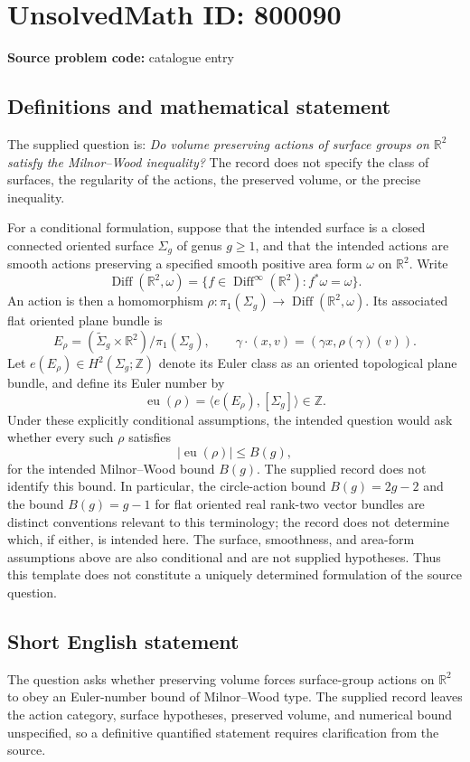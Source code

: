 \documentclass[11pt]{article}
\newcommand{\Z}{\mathbb{Z}}
\newcommand{\R}{\mathbb{R}}
\begin{document}
\section*{UnsolvedMath ID: 800090}
\textbf{Source problem code:} catalogue entry
\subsection{Definitions and mathematical statement}
The supplied question is: \emph{Do volume preserving actions of surface groups on $\R^2$ satisfy the Milnor--Wood inequality?} The record does not specify the class of surfaces, the regularity of the actions, the preserved volume, or the precise inequality.

For a conditional formulation, suppose that the intended surface is a closed connected oriented surface $\Sigma_g$ of genus $g\geq 1$, and that the intended actions are smooth actions preserving a specified smooth positive area form $\omega$ on $\R^2$. Write
\[
\operatorname{Diff}(\R^2,\omega)=\{f\in\operatorname{Diff}^{\infty}(\R^2):f^*\omega=\omega\}.
\]
An action is then a homomorphism $\rho:\pi_1(\Sigma_g)\to\operatorname{Diff}(\R^2,\omega)$. Its associated flat oriented plane bundle is
\[
E_\rho=(\widetilde{\Sigma}_g\times\R^2)/\pi_1(\Sigma_g),\qquad
\gamma\cdot(x,v)=(\gamma x,\rho(\gamma)(v)).
\]
Let $e(E_\rho)\in H^2(\Sigma_g;\Z)$ denote its Euler class as an oriented topological plane bundle, and define its Euler number by
\[
\operatorname{eu}(\rho)=\langle e(E_\rho),[\Sigma_g]\rangle\in\Z.
\]
Under these explicitly conditional assumptions, the intended question would ask whether every such $\rho$ satisfies
\[
|\operatorname{eu}(\rho)|\leq B(g),
\]
for the intended Milnor--Wood bound $B(g)$. The supplied record does not identify this bound. In particular, the circle-action bound $B(g)=2g-2$ and the bound $B(g)=g-1$ for flat oriented real rank-two vector bundles are distinct conventions relevant to this terminology; the record does not determine which, if either, is intended here. The surface, smoothness, and area-form assumptions above are also conditional and are not supplied hypotheses. Thus this template does not constitute a uniquely determined formulation of the source question.
\subsection{Short English statement}
The question asks whether preserving volume forces surface-group actions on $\R^2$ to obey an Euler-number bound of Milnor--Wood type. The supplied record leaves the action category, surface hypotheses, preserved volume, and numerical bound unspecified, so a definitive quantified statement requires clarification from the source.
\end{document}
